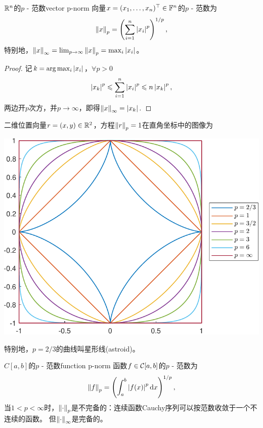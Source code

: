 \begin{example}
    {$\mathbb R^n$的$p$ - 范数}{vector p-norm}
    向量$x=(x_1,\ldots,x_n)^\top\in\mathbb F^n$的$p$ - 范数为
    \begin{equation}
        \label{eqn:p-norm vector}
        \left\lVert x\right\rVert_p=\left(\sum_{i=1}^n\left\lvert x_i\right\rvert^p\right)^{1/p},
    \end{equation}
    特别地，$\left\lVert x\right\rVert_\infty=\lim_{p\to\infty}\left\lVert x\right\rVert_p=\max_i\left\lvert x_i\right\rvert$。
    \begin{proof}
        记$k=\arg\max_i\left\lvert x_i\right\rvert$，$\forall p>0$
        \[
            \left\lvert x_k\right\rvert^p\leqslant\sum_{i=1}^n\left\lvert x_i\right\rvert^p\leqslant n\left\lvert x_k\right\rvert^p,
        \]
        两边开$p$次方，并$p\to\infty$，即得$\left\lVert x\right\rVert_\infty=\left\lvert x_k\right\rvert.$
    \end{proof}
    \tcblower
    二维位置向量$r=(x,y)\in\mathbb R^2$，方程$\left\lVert r\right\rVert_p=1$在直角坐标中的图像为
    \begin{center}
        \includegraphics[width=0.5\linewidth]{graphs/Lpspace.pdf}
        \label{fig:Lp space}
    \end{center}
    特别地，$p=2/3$的曲线叫星形线(astroid)。
\end{example}

\begin{example}
    {$C[a,b]$的$p$ - 范数}{function p-norm}
    函数$f\in\mathcal C[a,b]$的$p$ - 范数为
    \begin{equation}
        \label{eqn:p-norm function}
        \left\lVert f\right\rVert_p=\left(\int_a^b\left\lvert f(x)\right\rvert^p\mathop{}\!\mathrm{d} x\right)^{1/p},
    \end{equation}
    当$1<p<\infty$时，$\left\lVert\cdot\right\rVert_p$是不完备的：连续函数Cauchy序列可以按范数收敛于一个不连续的函数。
    但$\left\lVert\cdot\right\rVert_\infty$是完备的。
\end{example}

